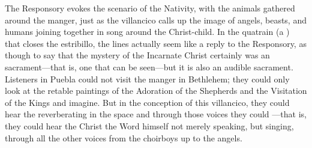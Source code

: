 \documentclass[12pt]{book}
\begin{document}
The Responsory evokes the scenario of the Nativity, with the animals gathered
around the manger, just as the villancico calls up the image of angels, beasts,
and humans joining together in song around the Christ-child.
In the quatrain (a ) that closes the estribillo, the lines
 actually seem like a
reply to the Responsory, as though to say that the mystery of the Incarnate
Christ certainly was an  sacrament---that is, one that can be
seen---but it is also an audible sacrament.
Listeners in Puebla could not visit the manger in Bethlehem; they could only look
at the retable paintings of the Adoration of the Shepherds and the Visitation of
the Kings and imagine.
But in the conception of this villancico, they could hear the  reverberating in the space and through those voices they could
---that is,
they could hear the Christ the Word himself not merely speaking, but singing,
through all the other voices from the choirboys up to the angels.
\end{document}
